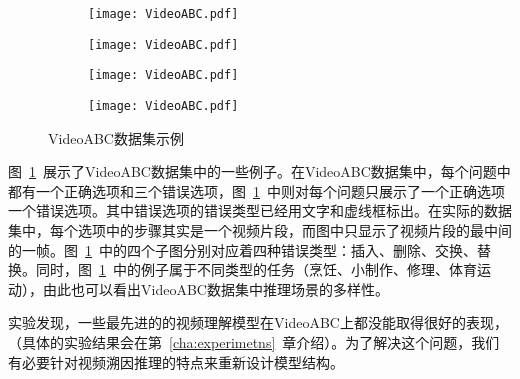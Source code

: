 \begin{figure}[]
    \begin{subfigure}{\textwidth}
        \centering
        \texttt{[image: VideoABC.pdf]}
        \caption{}
    \end{subfigure}
    \begin{subfigure}{\textwidth}
        \centering
        \texttt{[image: VideoABC.pdf]}
        \caption{}
    \end{subfigure}
    \begin{subfigure}{\textwidth}
        \centering
        \texttt{[image: VideoABC.pdf]}
        \caption{}
    \end{subfigure}
    \begin{subfigure}{\textwidth}
        \centering
        \texttt{[image: VideoABC.pdf]}
        \caption{}
    \end{subfigure}
    \caption{VideoABC数据集示例}
    \label{fig:illu}
\end{figure}
图~\ref{fig:illu}~展示了VideoABC数据集中的一些例子。在VideoABC数据集中，每个问题中都有一个正确选项和三个错误选项，图~\ref{fig:illu}~中则对每个问题只展示了一个正确选项一个错误选项。其中错误选项的错误类型已经用文字和虚线框标出。在实际的数据集中，每个选项中的步骤其实是一个视频片段，而图中只显示了视频片段的最中间的一帧。图~\ref{fig:illu}~中的四个子图分别对应着四种错误类型：插入、删除、交换、替换。同时，图~\ref{fig:illu}~中的例子属于不同类型的任务（烹饪、小制作、修理、体育运动），由此也可以看出VideoABC数据集中推理场景的多样性。

实验发现，一些最先进的的视频理解模型在VideoABC上都没能取得很好的表现，（具体的实验结果会在第~\ref{cha:experimetns}~章介绍）。为了解决这个问题，我们有必要针对视频溯因推理的特点来重新设计模型结构。